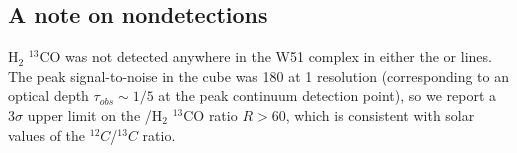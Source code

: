 
% 


\subsection{A note on nondetections}
H$_2$ $^{13}$CO was not detected anywhere in the W51 complex in either the
\oneone or \twotwo lines.  The peak signal-to-noise in the \formaldehyde \oneone cube was
180 at 1 \kms resolution (corresponding to an optical depth $\tau_{obs}\sim1/5$ at
the peak continuum detection point), so we report a $3\sigma$ upper limit on the
\formaldehyde/H$_2$ $^{13}$CO ratio $R>60$, which is consistent with solar
values of the $^{12}C$/$^{13}C$
ratio.

